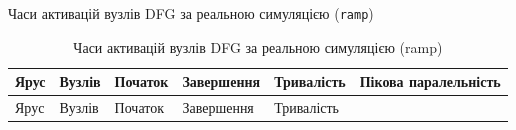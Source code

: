 \documentclass[
]{article}
\newcommand{\passthrough}[1]{#1}
\begin{document}
Часи активацій вузлів DFG за реальною симуляцією
(\passthrough{\lstinline!ramp!})

\begin{longtable}[]{@{}
  >{\raggedright\arraybackslash}p{}
  >{\raggedright\arraybackslash}p{}
  >{\raggedright\arraybackslash}p{}
  >{\raggedright\arraybackslash}p{}
  >{\raggedright\arraybackslash}p{}
  >{\raggedright\arraybackslash}p{}@{}}
\caption[Часи активацій вузлів DFG за реальною симуляцією (ramp)]{Часи
активацій вузлів DFG за реальною симуляцією (ramp)}\tabularnewline
\toprule\noalign{}
\begin{minipage}[b]{\linewidth}\raggedright
Ярус
\end{minipage} & \begin{minipage}[b]{\linewidth}\raggedright
Вузлів
\end{minipage} & \begin{minipage}[b]{\linewidth}\raggedright
Початок
\end{minipage} & \begin{minipage}[b]{\linewidth}\raggedright
Завершення
\end{minipage} & \begin{minipage}[b]{\linewidth}\raggedright
Тривалість
\end{minipage} & \begin{minipage}[b]{\linewidth}\raggedright
Пікова паралельність
\end{minipage} \\
\midrule\noalign{}
\endfirsthead
\toprule\noalign{}
\begin{minipage}[b]{\linewidth}\raggedright
Ярус
\end{minipage} & \begin{minipage}[b]{\linewidth}\raggedright
Вузлів
\end{minipage} & \begin{minipage}[b]{\linewidth}\raggedright
Початок
\end{minipage} & \begin{minipage}[b]{\linewidth}\raggedright
Завершення
\end{minipage} & \begin{minipage}[b]{\linewidth}\raggedright
Тривалість
\end{minipage} & \begin{minipage}[b]{\linewidth}\raggedright

\end{minipage}
\end{longtable}
\end{document}
